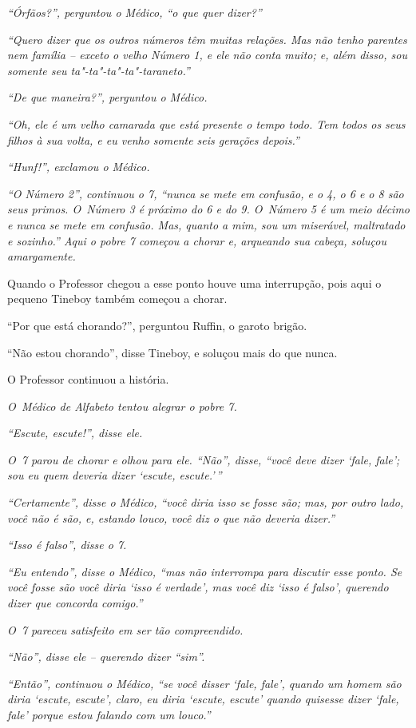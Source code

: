 \emph{``Órfãos?'', perguntou o Médico, ``o que quer dizer?''}

\emph{``Quero dizer que os outros números têm muitas relações. Mas não
tenho parentes nem família -- exceto o velho Número 1, e ele não conta
muito; e, além disso, sou somente seu ta"-ta"-ta"-ta"-taraneto.''}

\emph{``De que maneira?'', perguntou o Médico.}

\emph{``Oh, ele é um velho camarada que está presente o tempo todo.
Tem todos os seus filhos à sua volta, e eu venho somente seis gerações
depois.''}

\emph{``Hunf!'', exclamou o Médico.}

\emph{``O Número 2'', continuou o 7, ``nunca se mete em confusão, e o 4, o
6 e o 8 são seus primos. O~Número 3 é próximo do 6 e do 9. O~Número 5 é
um meio décimo e nunca se mete em confusão. Mas, quanto a mim, sou um
miserável, maltratado e sozinho.'' Aqui o pobre 7 começou a chorar e,
arqueando sua cabeça, soluçou amargamente.}

Quando o Professor chegou a esse ponto houve uma interrupção, pois aqui
o pequeno Tineboy também começou a chorar.

``Por que está chorando?'', perguntou Ruffin, o garoto brigão.

``Não estou chorando'', disse Tineboy, e soluçou mais do que
nunca.

O Professor continuou a história.

\emph{O~Médico de Alfabeto tentou alegrar o pobre 7.}

\emph{``Escute, escute!'', disse ele.}

\emph{O~7 parou de chorar e olhou para ele. ``Não'', disse, ``você
deve dizer `fale, fale'; sou eu quem deveria dizer `escute,
escute.'\,''}

\emph{``Certamente'', disse o Médico, ``você diria isso se fosse são;
mas, por outro lado, você não é são, e, estando louco, você diz o que
não deveria dizer.''}

\emph{``Isso é falso'', disse o 7.}

\emph{``Eu entendo'', disse o Médico, ``mas não interrompa para discutir
esse ponto. Se você fosse são você diria `isso é verdade', mas você diz
`isso é falso', querendo dizer que concorda comigo.''}

\emph{O~7 pareceu satisfeito em ser tão compreendido.}

\emph{``Não'', disse ele -- querendo dizer ``sim''.}

\emph{``Então'', continuou o Médico, ``se você disser `fale, fale',
quando um homem são diria `escute, escute', claro, eu diria `escute,
escute' quando quisesse dizer `fale, fale' porque estou falando com um
louco.''}

